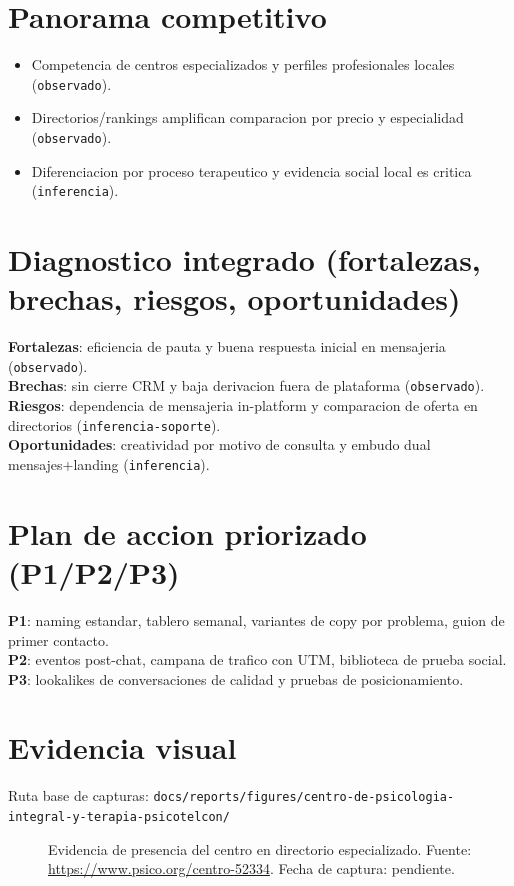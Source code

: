 \documentclass[9pt,a4paper,twocolumn,twoside]{tau-class/tau}
\begin{document}
\section{Panorama competitivo}
\begin{itemize}
  \item Competencia de centros especializados y perfiles profesionales locales (\texttt{observado}).
  \item Directorios/rankings amplifican comparacion por precio y especialidad (\texttt{observado}).
  \item Diferenciacion por proceso terapeutico y evidencia social local es critica (\texttt{inferencia}).
\end{itemize}

\section{Diagnostico integrado (fortalezas, brechas, riesgos, oportunidades)}
\textbf{Fortalezas}: eficiencia de pauta y buena respuesta inicial en mensajeria (\texttt{observado}).\\
\textbf{Brechas}: sin cierre CRM y baja derivacion fuera de plataforma (\texttt{observado}).\\
\textbf{Riesgos}: dependencia de mensajeria in-platform y comparacion de oferta en directorios (\texttt{inferencia-soporte}).\\
\textbf{Oportunidades}: creatividad por motivo de consulta y embudo dual mensajes+landing (\texttt{inferencia}).

\section{Plan de accion priorizado (P1/P2/P3)}
\textbf{P1}: naming estandar, tablero semanal, variantes de copy por problema, guion de primer contacto.\\
\textbf{P2}: eventos post-chat, campana de trafico con UTM, biblioteca de prueba social.\\
\textbf{P3}: lookalikes de conversaciones de calidad y pruebas de posicionamiento.

\section{Evidencia visual}
Ruta base de capturas:
\texttt{docs/reports/figures/centro-de-psicologia-integral-y-terapia-psicotelcon/}

\begin{figure}[H]
  \centering
  \caption{Evidencia de presencia del centro en directorio especializado. Fuente: \url{https://www.psico.org/centro-52334}. Fecha de captura: pendiente.}
  \label{fig:dir-psico-org}
\end{figure}
\end{document}
